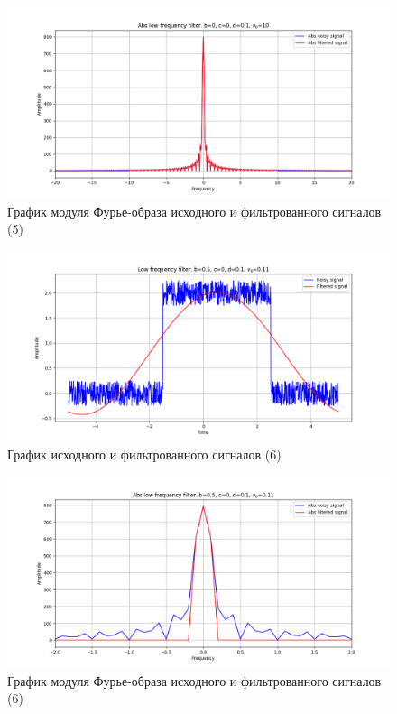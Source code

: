 \documentclass[a4paper, 12pt]{article}
\begin{document}
    \begin{figure}[!htb]
        \centering
        \includegraphics[scale=0.48]{4_abs_u_U_nohigh.png}
        \captionsetup{skip=0pt}
        \caption{График модуля Фурье-образа исходного и фильтрованного сигналов (5)}
        \label{fig:fig10}
    \end{figure}
    \begin{figure}[!htb]
        \centering
        \includegraphics[scale=0.48]{11_u_flt_u_nohigh.png}
        \captionsetup{skip=0pt}
        \caption{График исходного и фильтрованного сигналов (6)}
        \label{fig:fig11}
    \end{figure}
    \begin{figure}[!htb]
        \centering
        \includegraphics[scale=0.48]{11_abs_u_U_nohigh.png}
        \captionsetup{skip=0pt}
        \caption{График модуля Фурье-образа исходного и фильтрованного сигналов (6)}
        \label{fig:fig12}
    \end{figure}
\end{document}
